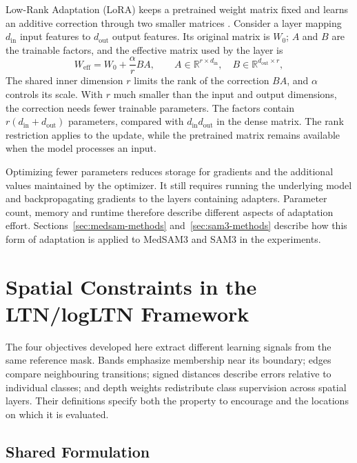 \documentclass[12pt,a4paper]{article}
\begin{document}
Low-Rank Adaptation (LoRA) keeps a pretrained weight matrix fixed and
learns an additive correction through two smaller matrices
\cite{hu2021lora}. Consider a layer mapping $d_{\mathrm{in}}$ input
features to $d_{\mathrm{out}}$ output features. Its original matrix is
$W_0$; $A$ and $B$ are the trainable factors, and the effective matrix
used by the layer is
\begin{equation}
W_{\mathrm{eff}}=W_0+\frac{\alpha}{r}BA,
\qquad
A\in\mathbb{R}^{r\times d_{\mathrm{in}}},\quad
B\in\mathbb{R}^{d_{\mathrm{out}}\times r},
\label{eq:lora-weight-update}
\end{equation}
The shared inner dimension $r$ limits the rank of the correction $BA$,
and $\alpha$ controls its scale. With $r$ much smaller than the input
and output dimensions, the correction needs fewer trainable parameters. The factors contain
$r(d_{\mathrm{in}}+d_{\mathrm{out}})$ parameters, compared with
$d_{\mathrm{in}}d_{\mathrm{out}}$ in the dense matrix. The rank restriction
applies to the update, while the pretrained matrix remains available
when the model processes an input.

Optimizing fewer parameters reduces storage for gradients and the additional
values maintained by the optimizer. It still requires running the underlying
model and backpropagating gradients to the layers containing adapters.
Parameter count, memory and runtime therefore describe different aspects of
adaptation effort. Sections~\ref{sec:medsam-methods}
and~\ref{sec:sam3-methods} describe how this form of adaptation is applied
to MedSAM3 and SAM3 in the experiments.

\clearpage
\section{Spatial Constraints in the LTN/logLTN Framework}
\label{sec:spatial-constraints}

The four objectives developed here extract different learning signals from
the same reference mask. Bands emphasize membership near its boundary;
edges compare neighbouring transitions; signed distances describe errors
relative to individual classes; and depth weights redistribute class
supervision across spatial layers. Their definitions specify both
the property to encourage and the locations on which it is evaluated.

\subsection{Shared Formulation}\label{sec:constraint-formulation}
\end{document}
